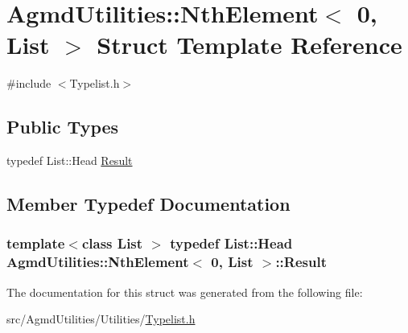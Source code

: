 \hypertarget{struct_agmd_utilities_1_1_nth_element_3_010_00_01_list_01_4}{\section{Agmd\+Utilities\+:\+:Nth\+Element$<$ 0, List $>$ Struct Template Reference}
\label{struct_agmd_utilities_1_1_nth_element_3_010_00_01_list_01_4}
}


{\ttfamily \#include $<$Typelist.\+h$>$}

\subsection*{Public Types}
\begin{DoxyCompactItemize}
\item 
typedef List\+::\+Head \hyperlink{struct_agmd_utilities_1_1_nth_element_3_010_00_01_list_01_4_a2bc0b31ead2a1bb9b5afe75d49d033a4}{Result}
\end{DoxyCompactItemize}


\subsection{Member Typedef Documentation}
\hypertarget{struct_agmd_utilities_1_1_nth_element_3_010_00_01_list_01_4_a2bc0b31ead2a1bb9b5afe75d49d033a4}{
\subsubsection[{Result}]{\setlength{\rightskip}{0pt plus 5cm}template$<$class List $>$ typedef List\+::\+Head {\bf Agmd\+Utilities\+::\+Nth\+Element}$<$ 0, {\bf List} $>$\+::{\bf Result}}}\label{struct_agmd_utilities_1_1_nth_element_3_010_00_01_list_01_4_a2bc0b31ead2a1bb9b5afe75d49d033a4}


The documentation for this struct was generated from the following file\+:\begin{DoxyCompactItemize}
\item 
src/\+Agmd\+Utilities/\+Utilities/\hyperlink{_typelist_8h}{Typelist.\+h}\end{DoxyCompactItemize}
